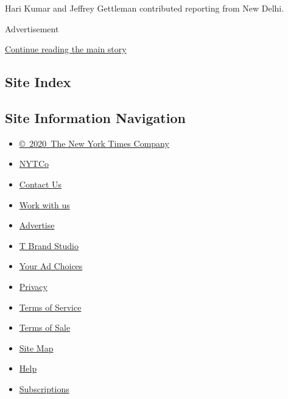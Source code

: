 Hari Kumar and Jeffrey Gettleman contributed reporting from New Delhi.

Advertisement

\protect\hyperlink{after-bottom}{Continue reading the main story}

\hypertarget{site-index}{%
\subsection{Site Index}\label{site-index}}

\hypertarget{site-information-navigation}{%
\subsection{Site Information
Navigation}\label{site-information-navigation}}

\begin{itemize}
\tightlist
\item
  \href{https://help.nytimes.com/hc/en-us/articles/115014792127-Copyright-notice}{©~2020~The
  New York Times Company}
\end{itemize}

\begin{itemize}
\tightlist
\item
  \href{https://www.nytco.com/}{NYTCo}
\item
  \href{https://help.nytimes.com/hc/en-us/articles/115015385887-Contact-Us}{Contact
  Us}
\item
  \href{https://www.nytco.com/careers/}{Work with us}
\item
  \href{https://nytmediakit.com/}{Advertise}
\item
  \href{http://www.tbrandstudio.com/}{T Brand Studio}
\item
  \href{https://www.nytimes.com/privacy/cookie-policy\#how-do-i-manage-trackers}{Your
  Ad Choices}
\item
  \href{https://www.nytimes.com/privacy}{Privacy}
\item
  \href{https://help.nytimes.com/hc/en-us/articles/115014893428-Terms-of-service}{Terms
  of Service}
\item
  \href{https://help.nytimes.com/hc/en-us/articles/115014893968-Terms-of-sale}{Terms
  of Sale}
\item
  \href{https://spiderbites.nytimes.com}{Site Map}
\item
  \href{https://help.nytimes.com/hc/en-us}{Help}
\item
  \href{https://www.nytimes.com/subscription?campaignId=37WXW}{Subscriptions}
\end{itemize}
